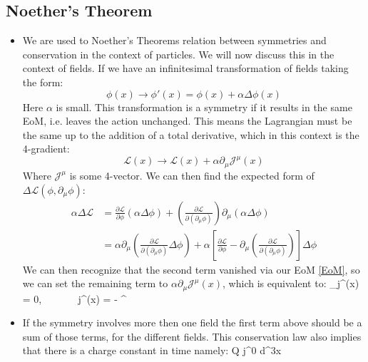\documentclass[11pt]{article}
\renewenvironment{flalign}{\vspace{-2mm}\empheq[box=\tcbhighmath]{align}}{\endempheq}
\numberwithin{equation}{section}
\begin{document}
\subsection{Noether's Theorem}
\begin{itemize}
  \item We are used to Noether's Theorems relation between symmetries and conservation in the context of particles. We will now discuss this in the context of fields. If we have an infinitesimal transformation of fields taking the form:
  \begin{equation*}
     \phi(x) \rightarrow \phi'(x) = \phi(x) + \alpha\Delta\phi(x)
   \end{equation*} 
Here $\alpha$ is small. This transformation is a symmetry if it results in the same EoM, i.e. leaves the action unchanged. This means the Lagrangian must be the same up to the addition of a total derivative, which in this context is the 4-gradient:
\[
      \mathcal{L}(x) \rightarrow \mathcal{L}(x) + \alpha \partial_{\mu}\mathcal{J}^{\mu}(x)
\]
    Where $\mathcal{J}^{\mu}$ is some 4-vector. We can then find the expected form of $\Delta \mathcal{L}(\phi,\partial_{\mu}\phi )$:
    \begin{align*}
     \alpha \Delta \mathcal{L} & = \frac{\partial \mathcal{L}}{\partial \phi}(\alpha \Delta \phi) + \left(\frac{\partial \mathcal{L}}{\partial (\partial_{\mu}\phi)}\right)\partial_{\mu}(\alpha\Delta\phi) \\
    &  = \alpha \partial_{\mu}\left(\frac{\partial \mathcal{L}}{\partial(\partial_{\mu}\phi)}\Delta \phi\right)+\alpha\left[\frac{\partial\mathcal{L}}{\partial \phi} - \partial_{\mu}\left(\frac{\partial \mathcal{L}}{\partial(\partial_{\mu}\phi)}\right)\right]\Delta \phi 
    \end{align*}
    We can then recognize that the second term vanished via our EoM \ref{EoM}, so we can set the remaining term to $\alpha \partial_{\mu}\mathcal{J}^{\mu}(x)$, which is equivalent to:
\begin{flalign}
\label{Noether}
  \partial_{\mu}j^{\mu}(x) = 0, ~~~~ ~~j^{\mu}(x) = \Delta \phi - ^{\mu}
\end{flalign}
\item If the symmetry involves more then one field the first term above should be a sum of those terms, for the different fields. This conservation law also implies that there is a charge constant in time namely:
\begin{flalign}
\label{charge}
Q \equiv \int j^{0} d^3x
\end{flalign}
\end{itemize}
\end{document}
